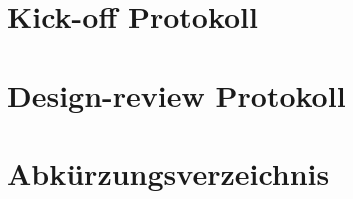 \documentclass[
11pt, %
a4paper, %
BCOR15mm, %
DIV14, %
footsepline = false, %
headsepline, %
oneside,
openright,
halfparskip, %
abstracton, %
listof=totocnumbered, %
bibliography=totocnumbered %
]{scrreprt}
\begin{document}
  

  \cleardoublepage

 
 
  \chapter{Kick-off Protokoll}\label{chapter:KickOffProtokoll}

  
  
  \cleardoublepage
  
   
  \chapter{Design-review Protokoll}\label{chapter:DesignReviewProtokoll}
  
  
  
  \cleardoublepage
  
  
  \chapter{Abkürzungsverzeichnis}\label{chapter:Abkuerzungsverzeichnis}

  
  
  \cleardoublepage
  
  
\end{document}
